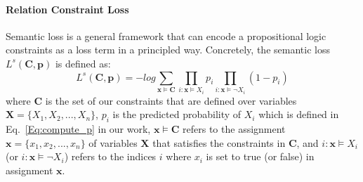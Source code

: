 \paragraph{Relation Constraint Loss}
Semantic loss is a general framework that can encode a propositional logic constraints as a loss term in a principled way.
Concretely, the semantic loss $L^{s}(\bm{C}, \bm{p})$ is defined as:
\begin{equation}
\label{seq:semantic_loss}
	L^{s}(\bm{C}, \bm{p}) = -log\sum\limits_{\bm x\models\bm{C}}\prod\limits_{i:\bm x\models X_i}p_i\prod\limits_{i:\bm x\models \neg X_i}(1-p_i)
\end{equation}
where $\bm{C}$ is the set of our constraints that are defined over variables $\bm{X}=\{X_1, X_2,...,X_n\}$,
$p_i$ is the predicted probability of $X_i$ which is defined in Eq.~\ref{Eq:compute_p} in our work,
$\bm x \models \bm{C}$ refers to the assignment $\bm{x} = \{x_1, x_2,...,x_n\}$ of variables $\bm X$ that satisfies the constraints in $\bm{C}$,
and $i:\bm x \models X_i$ (or $i:\bm x\models \neg X_i$) refers to the indices $i$ where $x_i$ is set to true (or false) in assignment $\bm x$.


